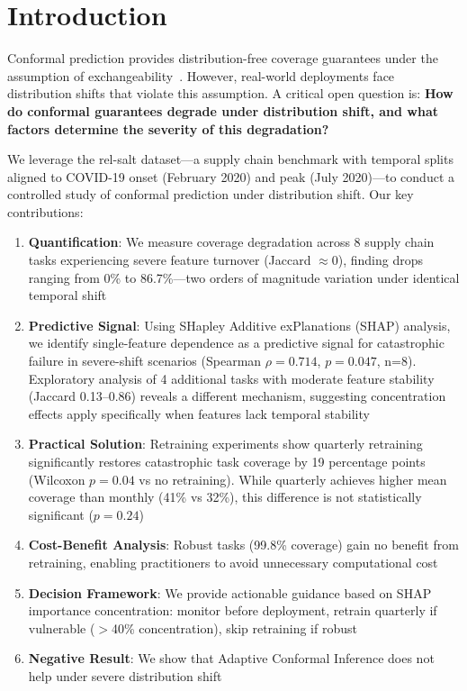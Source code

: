 \documentclass[sigconf]{acmart}
\begin{document}
\maketitle

\section{Introduction}

Conformal prediction provides distribution-free coverage guarantees under the assumption of exchangeability~\cite{vovk2005algorithmic}. However, real-world deployments face distribution shifts that violate this assumption. A critical open question is: \textbf{How do conformal guarantees degrade under distribution shift, and what factors determine the severity of this degradation?}

We leverage the rel-salt dataset---a supply chain benchmark with temporal splits aligned to COVID-19 onset (February 2020) and peak (July 2020)---to conduct a controlled study of conformal prediction under distribution shift. Our key contributions:

\begin{enumerate}
    \item \textbf{Quantification}: We measure coverage degradation across 8 supply chain tasks experiencing severe feature turnover (Jaccard $\approx$0), finding drops ranging from 0\% to 86.7\%---two orders of magnitude variation under identical temporal shift
    \item \textbf{Predictive Signal}: Using SHapley Additive exPlanations (SHAP) analysis, we identify single-feature dependence as a predictive signal for catastrophic failure in severe-shift scenarios (Spearman $\rho = 0.714$, $p = 0.047$, n=8). Exploratory analysis of 4 additional tasks with moderate feature stability (Jaccard 0.13--0.86) reveals a different mechanism, suggesting concentration effects apply specifically when features lack temporal stability
    \item \textbf{Practical Solution}: Retraining experiments show quarterly retraining significantly restores catastrophic task coverage by 19 percentage points (Wilcoxon $p=0.04$ vs no retraining). While quarterly achieves higher mean coverage than monthly (41\% vs 32\%), this difference is not statistically significant ($p=0.24$)
    \item \textbf{Cost-Benefit Analysis}: Robust tasks (99.8\% coverage) gain no benefit from retraining, enabling practitioners to avoid unnecessary computational cost
    \item \textbf{Decision Framework}: We provide actionable guidance based on SHAP importance concentration: monitor before deployment, retrain quarterly if vulnerable ($>$40\% concentration), skip retraining if robust
    \item \textbf{Negative Result}: We show that Adaptive Conformal Inference does not help under severe distribution shift
\end{enumerate}
\end{document}
